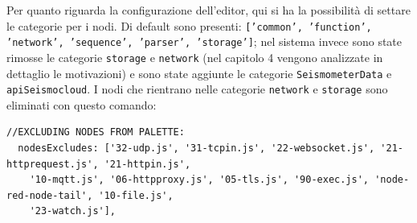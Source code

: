 \documentclass[a4paper,10pt]{memoir}
\begin{document}
Per quanto riguarda la configurazione dell'editor, qui si ha la possibilità di settare le categorie per i nodi. Di default sono presenti: \texttt{['common', 'function', 'network', 'sequence', 'parser', 'storage']}; nel sistema invece sono state rimosse le categorie \texttt{storage} e \texttt{network} (nel capitolo 4 vengono analizzate in dettaglio le motivazioni) e sono state aggiunte le categorie \texttt{SeismometerData} e \texttt{apiSeismocloud}.
I nodi che rientrano nelle categorie \texttt{network} e \texttt{storage} sono eliminati con questo comando:
\begin{lstlisting}
//EXCLUDING NODES FROM PALETTE:
  nodesExcludes: ['32-udp.js', '31-tcpin.js', '22-websocket.js', '21-httprequest.js', '21-httpin.js',
    '10-mqtt.js', '06-httpproxy.js', '05-tls.js', '90-exec.js', 'node-red-node-tail', '10-file.js',
    '23-watch.js'],
\end{lstlisting}
\end{document}
